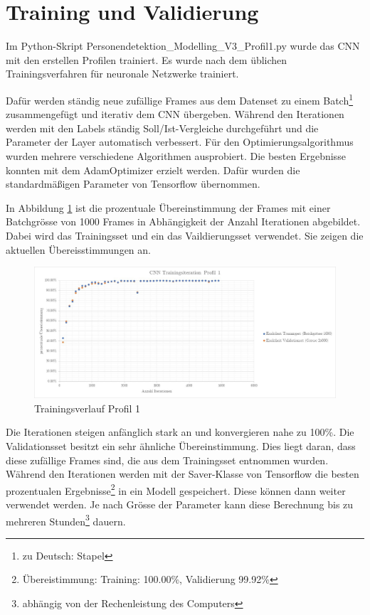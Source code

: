 \newpage
\section{Training und Validierung}
\label{TrainingValidierung}

Im Python-Skript Personendetektion\_Modelling\_V3\_Profil1.py wurde das \ac{CNN} mit den erstellen Profilen trainiert. Es wurde nach dem üblichen Trainingsverfahren für neuronale Netzwerke trainiert.

Dafür werden ständig neue zufällige Frames aus dem Datenset zu einem Batch\footnote{zu Deutsch: Stapel} zusammengefügt und iterativ dem \ac{CNN} übergeben. Während den Iterationen werden mit den Labels ständig Soll/Ist-Vergleiche durchgeführt und die Parameter der Layer automatisch verbessert. 
Für den Optimierungsalgorithmus wurden mehrere verschiedene Algorithmen ausprobiert. Die besten Ergebnisse konnten mit dem AdamOptimizer erzielt werden. Dafür wurden die standardmäßigen Parameter von Tensorflow übernommen.

In Abbildung \ref{fig:traininsverlauf} ist die prozentuale Übereinstimmung der Frames mit einer Batchgrösse von 1000 Frames in Abhängigkeit der Anzahl Iterationen abgebildet. Dabei wird das Trainingsset und ein das Vaildierungsset verwendet. Sie zeigen die aktuellen Übereisstimmungen an. 

\begin{figure}[H]
	\centering
	\caption[Trainingsverlauf Profil 1]{Trainingsverlauf Profil 1}
	\label{fig:traininsverlauf}
	\includegraphics[width=1.0\linewidth]{fig/Traininsverlauf}
\end{figure}

Die Iterationen steigen anfänglich stark an und konvergieren nahe zu 100\%. Die Validationsset besitzt ein sehr ähnliche Übereinstimmung. Dies liegt daran, dass diese zufällige Frames sind, die aus dem Trainingsset entnommen wurden. Während den Iterationen werden mit der Saver-Klasse von Tensorflow die besten prozentualen Ergebnisse\footnote{Übereistimmung: Training: 100.00\%, Validierung 99.92\%}  in ein Modell gespeichert. Diese können dann weiter verwendet werden. Je nach Grösse der Parameter kann diese Berechnung bis zu mehreren Stunden\footnote{abhängig von der Rechenleistung des Computers} dauern. 


